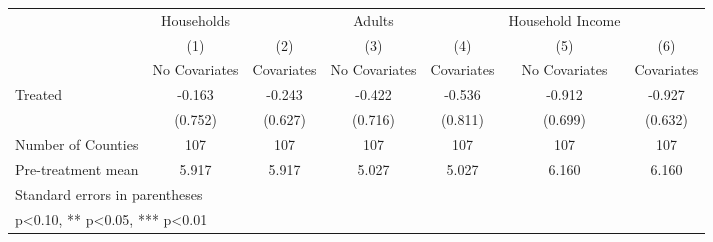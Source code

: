 {
\def\sym#1{\ifmmode^{#1}\else\(^{#1}\)\fi}
\begin{tabular}{l*{6}{c}}
\hline\hline
            &  Households   &               &      Adults   &               &Household Income   &               \\
            &\multicolumn{1}{c}{(1)}&\multicolumn{1}{c}{(2)}&\multicolumn{1}{c}{(3)}&\multicolumn{1}{c}{(4)}&\multicolumn{1}{c}{(5)}&\multicolumn{1}{c}{(6)}\\
            &\multicolumn{1}{c}{No Covariates}&\multicolumn{1}{c}{Covariates}&\multicolumn{1}{c}{No Covariates}&\multicolumn{1}{c}{Covariates}&\multicolumn{1}{c}{No Covariates}&\multicolumn{1}{c}{Covariates}\\
\hline
Treated     &      -0.163   &      -0.243   &      -0.422   &      -0.536   &      -0.912   &      -0.927   \\
            &     (0.752)   &     (0.627)   &     (0.716)   &     (0.811)   &     (0.699)   &     (0.632)   \\
\hline
Number of Counties&         107   &         107   &         107   &         107   &         107   &         107   \\
Pre-treatment mean&       5.917   &       5.917   &       5.027   &       5.027   &       6.160   &       6.160   \\
\hline\hline
\multicolumn{7}{l}{\footnotesize Standard errors in parentheses}\\
\multicolumn{7}{l}{\footnotesize * p<0.10, ** p<0.05, *** p<0.01}\\
\end{tabular}
}
